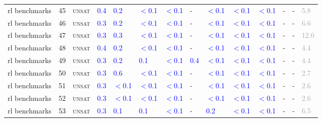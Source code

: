 \begin{center}
{\begin{longtable}{@{}llllllllllllll@{}}
rl benchmarks & 45 & \textsc{unsat} & \textcolor{blue}{0.4} & \textcolor{blue}{0.2} & \textcolor{blue}{$<$0.1} & \textcolor{blue}{$<$0.1} & - & \textcolor{blue}{$<$0.1} & \textcolor{blue}{$<$0.1} & \textcolor{blue}{$<$0.1} & - & - & \textcolor{darkgray}{5.8} \\
rl benchmarks & 46 & \textsc{unsat} & \textcolor{blue}{0.3} & \textcolor{blue}{0.2} & \textcolor{blue}{$<$0.1} & \textcolor{blue}{$<$0.1} & - & \textcolor{blue}{$<$0.1} & \textcolor{blue}{$<$0.1} & \textcolor{blue}{$<$0.1} & - & - & \textcolor{darkgray}{6.6} \\
rl benchmarks & 47 & \textsc{unsat} & \textcolor{blue}{0.3} & \textcolor{blue}{0.3} & \textcolor{blue}{$<$0.1} & \textcolor{blue}{$<$0.1} & - & \textcolor{blue}{$<$0.1} & \textcolor{blue}{$<$0.1} & \textcolor{blue}{$<$0.1} & - & - & \textcolor{darkgray}{12.0} \\
rl benchmarks & 48 & \textsc{unsat} & \textcolor{blue}{0.4} & \textcolor{blue}{0.2} & \textcolor{blue}{$<$0.1} & \textcolor{blue}{$<$0.1} & - & \textcolor{blue}{$<$0.1} & \textcolor{blue}{$<$0.1} & \textcolor{blue}{$<$0.1} & - & - & \textcolor{darkgray}{4.4} \\
rl benchmarks & 49 & \textsc{unsat} & \textcolor{blue}{0.3} & \textcolor{blue}{0.2} & \textcolor{blue}{0.1} & \textcolor{blue}{$<$0.1} & \textcolor{blue}{0.4} & \textcolor{blue}{$<$0.1} & \textcolor{blue}{$<$0.1} & \textcolor{blue}{$<$0.1} & - & - & \textcolor{darkgray}{4.4} \\
rl benchmarks & 50 & \textsc{unsat} & \textcolor{blue}{0.3} & \textcolor{blue}{0.6} & \textcolor{blue}{$<$0.1} & \textcolor{blue}{$<$0.1} & - & \textcolor{blue}{$<$0.1} & \textcolor{blue}{$<$0.1} & \textcolor{blue}{$<$0.1} & - & - & \textcolor{darkgray}{2.7} \\
rl benchmarks & 51 & \textsc{unsat} & \textcolor{blue}{0.3} & \textcolor{blue}{$<$0.1} & \textcolor{blue}{$<$0.1} & \textcolor{blue}{$<$0.1} & - & \textcolor{blue}{$<$0.1} & \textcolor{blue}{$<$0.1} & \textcolor{blue}{$<$0.1} & - & - & \textcolor{darkgray}{2.6} \\
rl benchmarks & 52 & \textsc{unsat} & \textcolor{blue}{0.3} & \textcolor{blue}{$<$0.1} & \textcolor{blue}{$<$0.1} & \textcolor{blue}{$<$0.1} & - & \textcolor{blue}{$<$0.1} & \textcolor{blue}{$<$0.1} & \textcolor{blue}{$<$0.1} & - & - & \textcolor{darkgray}{2.6} \\
rl benchmarks & 53 & \textsc{unsat} & \textcolor{blue}{0.3} & \textcolor{blue}{0.1} & \textcolor{blue}{0.1} & \textcolor{blue}{$<$0.1} & - & \textcolor{blue}{0.2} & \textcolor{blue}{$<$0.1} & \textcolor{blue}{$<$0.1} & - & - & \textcolor{darkgray}{6.5} \\

\end{longtable}}
\end{center}
